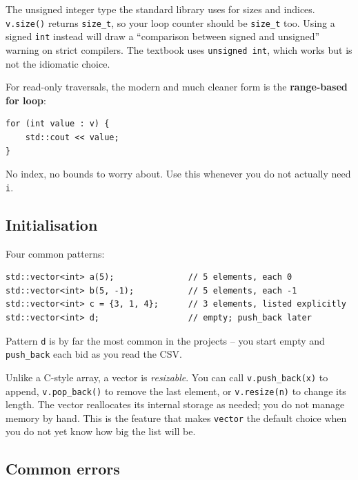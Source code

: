 \documentclass[11pt]{article}
\begin{document}
\begin{defnbox}
The unsigned integer type the standard library uses for sizes and
indices. \texttt{v.size()} returns \texttt{size\_t}, so your loop
counter should be \texttt{size\_t} too. Using a signed
\texttt{int} instead will draw a ``comparison between signed and
unsigned'' warning on strict compilers. The textbook uses
\texttt{unsigned int}, which works but is not the idiomatic choice.
\end{defnbox}

For read-only traversals, the modern and much cleaner form is the
\textbf{range-based for loop}:
\begin{lstlisting}
for (int value : v) {
    std::cout << value;
}
\end{lstlisting}
No index, no bounds to worry about. Use this whenever you do not
actually need \texttt{i}.

\subsection{Initialisation}

Four common patterns:
\begin{lstlisting}
std::vector<int> a(5);               // 5 elements, each 0
std::vector<int> b(5, -1);           // 5 elements, each -1
std::vector<int> c = {3, 1, 4};      // 3 elements, listed explicitly
std::vector<int> d;                  // empty; push_back later
\end{lstlisting}
Pattern \texttt{d} is by far the most common in the projects -- you
start empty and \texttt{push\_back} each bid as you read the CSV.

\begin{ideabox}
Unlike a C-style array, a vector is \emph{resizable}. You can call
\texttt{v.push\_back(x)} to append, \texttt{v.pop\_back()} to remove
the last element, or \texttt{v.resize(n)} to change its length. The
vector reallocates its internal storage as needed; you do not manage
memory by hand. This is the feature that makes \texttt{vector} the
default choice when you do not yet know how big the list will be.
\end{ideabox}

\subsection{Common errors}
\end{document}
